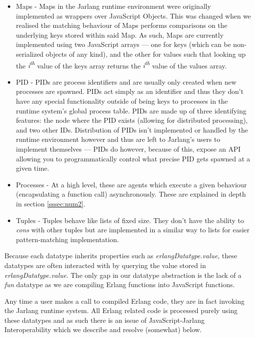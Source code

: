 \documentclass[twoside,12pt,titlepage,a4paper]{article}
\begin{document}
\begin{itemize}
\item Maps - Maps in the Jarlang runtime environment were originally implemented as wrappers over JavaScript Objects. This was changed when we realised the matching behaviour of Maps performs comparisons on the underlying keys stored within said Map. As such, Maps are currently implemented using two JavaScript arrays --- one for keys (which can be non-serialized objects of any kind), and the other for values such that looking up the \textit{i\textsuperscript{th}} value of the keys array returns the \textit{i\textsuperscript{th}} value of the values array.

\item PID - PIDs are process identifiers and are usually only created when new processes are spawned. PIDs act simply as an identifier and thus they don't have any special functionality outside of being keys to processes in the runtime system's global process table. PIDs are made up of three identifying features: the node where the PID exists (allowing for distributed processing), and two other IDs. Distribution of PIDs isn't implemented or handled by the runtime environment however and thus are left to Jarlang's users to implement themselves --- PIDs do however, because of this, expose an API allowing you to programmatically control what precise PID gets spawned at a given time.

\item Processes - At a high level, these are agents which execute a given behaviour (encapsulating a function call) asynchronously. These are explained in depth in section \ref{sssec:num2}.

\item Tuples - Tuples behave like lists of fixed size. They don't have the ability to \textit{cons} with other tuples but are implemented in a similar way to lists for easier pattern-matching implementation.

\end{itemize}

Because each datatype inherits properties such as \textit{erlangDatatype.value}, these datatypes are often interacted with by querying the value stored in \textit{erlangDatatype.value}. The only gap in our datatype abstraction is the lack of a \textit{fun} datatype as we are compiling Erlang functions into JavaScript functions. 

Any time a user makes a call to compiled Erlang code, they are in fact invoking the Jarlang runtime system. All Erlang related code is processed purely using these datatypes and as such there is an issue of JavaScript-Jarlang Interoperability which we describe and resolve (somewhat) below.
\end{document}
